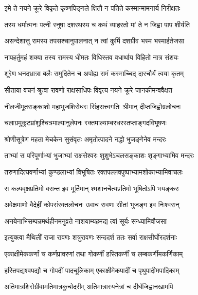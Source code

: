 \twolineshloka
{इमे ते नयने क्रूरे विकृते कृष्णपिङ्गले}
{क्षितौ न पतिते कस्मान्मामनार्य निरीक्षतः} %

\twolineshloka
{तस्य धर्मात्मनः पत्नी स्नुषा दशरथस्य च}
{कथं व्याहरतो मां ते न जिह्वा पाप शीर्यति} %

\twolineshloka
{असन्देशात्तु रामस्य तपसश्चानुपालनात्}
{न त्वां कुर्मि दशग्रीव भस्म भस्मार्हतेजसा} %

\twolineshloka
{नापहर्तुमहं शक्या तस्य रामस्य धीमतः}
{विधिस्तव वधार्थाय विहितो नात्र संशयः} %

\twolineshloka
{शूरेण धनदभ्रात्रा बलैः समुदितेन च}
{अपोह्य रामं कस्माच्चिद् दारचौर्यं त्वया कृतम्} %

\twolineshloka
{सीताया वचनं श्रुत्वा रावणो राक्षसाधिपः}
{विवृत्य नयने क्रूरे जानकीमन्ववैक्षत} %

\twolineshloka
{नीलजीमूतसङ्काशो महाभुजशिरोधरः}
{सिंहसत्त्वगतिः श्रीमान् दीप्तजिह्वोग्रलोचनः} %

\twolineshloka
{चलाग्रमुकुटप्रांशुश्चित्रमाल्यानुलेपनः}
{रक्तमाल्याम्बरधरस्तप्ताङ्गदविभूषणः} %

\twolineshloka
{श्रोणीसूत्रेण महता मेचकेन सुसंवृतः}
{अमृतोत्पादने नद्धो भुजङ्गेनेव मन्दरः} %

\twolineshloka
{ताभ्यां स परिपूर्णाभ्यां भुजाभ्यां राक्षसेश्वरः}
{शुशुभेऽचलसङ्काशः शृङ्गाभ्यामिव मन्दरः} %

\twolineshloka
{तरुणादित्यवर्णाभ्यां कुण्डलाभ्यां विभूषितः}
{रक्तपल्लवपुष्पाभ्यामशोकाभ्यामिवाचलः} %

\twolineshloka
{स कल्पवृक्षप्रतिमो वसन्त इव मूर्तिमान्}
{श्मशानचैत्यप्रतिमो भूषितोऽपि भयङ्करः} %

\twolineshloka
{अवेक्षमाणो वैदेहीं कोपसंरक्तलोचनः}
{उवाच रावणः सीतां भुजङ्ग इव निःश्वसन्} %

\twolineshloka
{अनयेनाभिसम्पन्नमर्थहीनमनुव्रते}
{नाशयाम्यहमद्य त्वां सूर्यः सन्ध्यामिवौजसा} %

\twolineshloka
{इत्युक्त्वा मैथिलीं राजा रावणः शत्रुरावणः}
{सन्ददर्श ततः सर्वा राक्षसीर्घोरदर्शनाः} %

\twolineshloka
{एकाक्षीमेककर्णां च कर्णप्रावरणां तथा}
{गोकर्णीं हस्तिकर्णीं च लम्बकर्णीमकर्णिकाम्} %

\twolineshloka
{हस्तिपद्यश्वपद्यौ च गोपदीं पादचूलिकाम्}
{एकाक्षीमेकपादीं च पृथुपादीमपादिकाम्} %

\twolineshloka
{अतिमात्रशिरोग्रीवामतिमात्रकुचोदरीम्}
{अतिमात्रास्यनेत्रां च दीर्घजिह्वानखामपि} %

